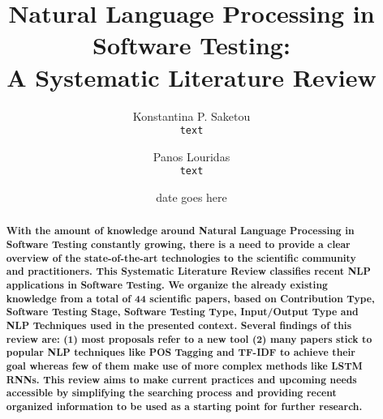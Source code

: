 \documentclass[11pt, notitlepage]{report}
\author{
  Konstantina P. Saketou\\
  \texttt{text}
  \and
  Panos Louridas\\
  \texttt{text}
}
\date{date goes here}
\title{Natural Language Processing in Software Testing:\\ A Systematic Literature Review}
\begin{document}
  \maketitle
  \begin{center} 
              \begin{abstract}
                  \bfseries
                      With the amount of knowledge around Natural Language Processing in Software Testing constantly growing, there is a need to provide a clear overview of the state-of-the-art 
                      technologies to the scientific community and practitioners. This Systematic Literature Review classifies recent NLP applications in Software Testing. We organize 
                      the already existing knowledge from a total of 44 scientific papers, based on Contribution Type, Software Testing Stage, 
                      Software Testing Type, Input/Output Type and NLP Techniques used in the presented context. Several findings of this review are: (1) most 
                      proposals refer to a new tool (2) many papers stick to popular NLP techniques like POS Tagging and TF-IDF to achieve their goal whereas 
                      few of them make use of more complex methods like LSTM RNNs. This review aims to make current practices and upcoming needs accessible by simplifying 
                      the searching process and providing recent organized information to be used as a starting point for further research.
              \end{abstract}
  \end{center} 










\end{document}

